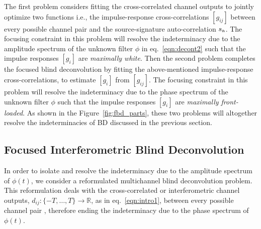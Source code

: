 \documentclass{article}
\theoremstyle{definition}
\newcommand{\R}{\mathbb{R}}
\def\vecc#1{[#1]}
\newcommand\sa[1][]{{#1{s}}_{\rm a}}
\begin{document}
{%
The first problem considers
fitting 
the cross-correlated channel outputs
to jointly 
optimize two functions i.e., the impulse-response cross-correlations $\vecc{g_{ij}}$
between every possible channel pair
and the source-signature auto-correlation $\sa$.
%
The focusing constraint in this problem will resolve the indeterminacy due to the 
amplitude spectrum of the unknown filter  
$\phi$ in eq.~\ref{eqn:decont2} such that the impulse responses $\vecc{g_i}$ are \emph{maximally white}.
%
Then the second problem completes the focused blind deconvolution
by fitting 
the above-mentioned impulse-response cross-correlations, to estimate $\vecc{g_i}$ from $\vecc{g_{ij}}$.
%
The focusing constraint in this problem will resolve 
the indeterminacy due to the phase spectrum of 
the unknown filter
$\phi$ such that the impulse responses $\vecc{g_i}$ are \emph{maximally front-loaded}.
%
As shown in the Figure~\ref{fig:fbd_parts},
these two problems will altogether 
resolve the indeterminacies of BD discussed in
the previous section.

\subsection{Focused Interferometric Blind Deconvolution}

In order to isolate and resolve the indeterminacy due to the amplitude spectrum of $\phi(t)$, 
we consider a reformulated multichannel blind deconvolution problem.
%
This reformulation deals with
the 
cross-correlated or interferometric channel outputs, $d_{ij} : \{-T,\ldots,T\}\to \R$, 
as in eq.~\ref{eqn:intro1},  
between every possible
channel pair \citep[cf.,][]{demanet2017convex}, therefore 
ending the indeterminacy due to the phase spectrum of $\phi(t)$.
%


}
\end{document}
